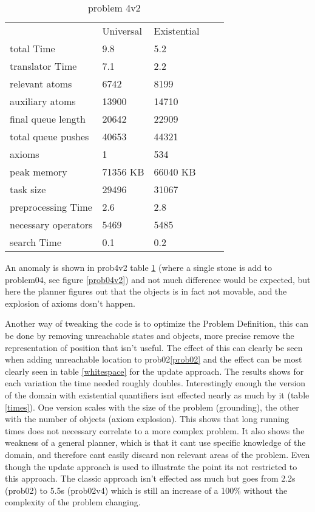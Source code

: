 			\begin{table}[h]
				\centering
				\caption{problem 4v2}
				\label{prob4v2}
				\begin{tabular}{lllll}
					& Universal & Existential  \\
					total Time & 9.8 & 5.2 \\
					translator Time& 7.1  & 2.2 \\
					
					
					relevant atoms & 6742 & 8199\\
					auxiliary atoms & 13900 & 14710\\
					final queue length & 20642 & 22909\\
					total queue pushes & 40653 & 44321\\
					axioms & 1 & 534 \\ 
					peak memory & 71356 KB & 66040 KB\\ 
					task size &29496 & 31067 \\
					
					
					preprocessing Time & 2.6 & 2.8 \\
					necessary operators & 5469 & 5485 \\
					
					
					search Time & 0.1 & 0.2 \\
				\end{tabular}
			\end{table}
			An anomaly is shown in prob4v2 table \ref{prob4v2} (where a single stone is add to problem04, see figure \ref{prob04v2}) and not much difference would be expected, but here the planner figures out that the objects is in fact not movable, and the explosion of axioms dosn't happen. 
			
			Another way of tweaking the code is to optimize the Problem Definition, this can be done by removing unreachable states and objects, more precise remove the representation of position that isn't useful. The effect of this can clearly be seen when adding unreachable location to prob02\ref{prob02} and the effect can be most clearly seen in table \ref{whitespace} for the update approach. The results shows for each variation the time needed roughly doubles. Interestingly enough the version of the domain with existential quantifiers isnt effected nearly as much by it (table \ref{times}). One version scales with the size of the problem (grounding), the other with the number of objects (axiom explosion). This shows that long running times does not necessary correlate to a more complex problem. It also shows the weakness of a general planner, which is that it cant use specific knowledge of the domain, and therefore cant easily discard non relevant areas of the problem. Even though the update approach is used to illustrate the point its not restricted to this approach. The classic approach isn't effected ass much but goes from 2.2s (prob02) to 5.5s (prob02v4) which is still an increase of a 100\% without the complexity of the problem changing.
			
